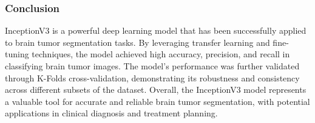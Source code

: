 

\subsubsection{Conclusion}

InceptionV3 is a powerful deep learning model that has been successfully applied to brain tumor segmentation tasks. By leveraging transfer learning and fine-tuning techniques, the model achieved high accuracy, precision, and recall in classifying brain tumor images. The model's performance was further validated through K-Folds cross-validation, demonstrating its robustness and consistency across different subsets of the dataset. Overall, the InceptionV3 model represents a valuable tool for accurate and reliable brain tumor segmentation, with potential applications in clinical diagnosis and treatment planning.
